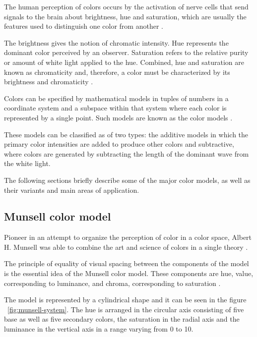 The human perception of colors occurs by the activation of nerve cells that send signals to the brain about brightness, hue and saturation, which are usually the features used to distinguish one color from another \citep{gonzalez:02}.

The brightness gives the notion of chromatic intensity. Hue represents the dominant color perceived by an observer. Saturation refers to the relative purity or amount of white light applied to the hue. Combined, hue and saturation are known as chromaticity and, therefore, a color must be characterized by its brightness and chromaticity \citep{gonzalez:02}.

Colors can be specified by mathematical models in tuples of numbers in a coordinate system and a subspace within that system where each color is represented by a single point. Such models are known as the color models \citep{gonzalez:02}.

These models can be classified as of two types: the additive models in which the primary color intensities are added to produce other colors and subtractive, where colors are generated by subtracting the length of the dominant wave from the white light.

The following sections briefly describe some of the major color models, as well as their variants and main areas of application.

\subsection{Munsell color model}
\label{sec:modelo_cores_munsell}

Pioneer in an attempt to organize the perception of color in a color space, Albert H. Munsell was able to combine the art and science of colors in a single theory \citep{konstantinos:00}.

The principle of equality of visual spacing between the components of the model is the essential idea of the Munsell color model. These components are hue, value, corresponding to luminance, and chroma, corresponding to saturation \citep{konstantinos:00}.

The model is represented by a cylindrical shape and it can be seen in the figure ~\ref{fig:munsell-system}. The hue is arranged in the circular axis consisting of five base as well as five secondary colors, the saturation in the radial axis and the luminance in the vertical axis in a range varying from 0 to 10.


